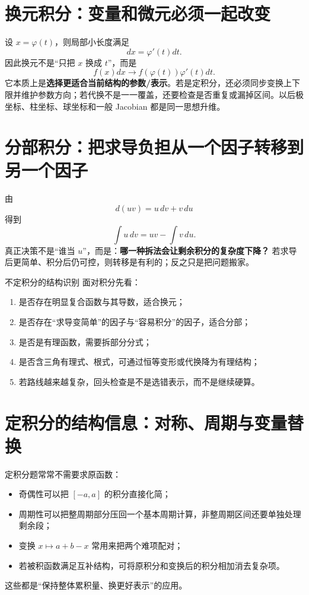 \documentclass[11pt,a4paper,openany]{ctexbook}
\newcommand{\key}[1]{\textbf{\color{deep}#1}}
\begin{document}
\section{换元积分：变量和微元必须一起改变}
设 $x=\varphi(t)$，则局部小长度满足
\[
dx=\varphi'(t)dt.
\]
因此换元不是“只把 $x$ 换成 $t$”，而是
\[
\boxed{f(x)dx\to f(\varphi(t))\varphi'(t)dt}.
\]
它本质上是\key{选择更适合当前结构的参数/表示}。若是定积分，还必须同步变换上下限并维护参数方向；若代换不是一一覆盖，还要检查是否重复或漏掉区间。以后极坐标、柱坐标、球坐标和一般 Jacobian 都是同一思想升维。

\section{分部积分：把求导负担从一个因子转移到另一个因子}
由
\[
d(uv)=u\,dv+v\,du
\]
得到
\[
\int u\,dv=uv-\int v\,du.
\]
真正决策不是“谁当 $u$”，而是：\key{哪一种拆法会让剩余积分的复杂度下降？} 若求导后更简单、积分后仍可控，则转移是有利的；反之只是把问题搬家。

\begin{methodbox}{不定积分的结构识别}
面对积分先看：
\begin{enumerate}
  \item 是否存在明显复合函数与其导数，适合换元；
  \item 是否存在“求导变简单”的因子与“容易积分”的因子，适合分部；
  \item 是否是有理函数，需要拆部分分式；
  \item 是否含三角有理式、根式，可通过恒等变形或代换降为有理结构；
  \item 若路线越来越复杂，回头检查是不是选错表示，而不是继续硬算。
\end{enumerate}
\end{methodbox}

\section{定积分的结构信息：对称、周期与变量替换}
定积分题常常不需要求原函数：
\begin{itemize}
  \item 奇偶性可以把 $[-a,a]$ 的积分直接化简；
  \item 周期性可以把整周期部分压回一个基本周期计算，非整周期区间还要单独处理剩余段；
  \item 变换 $x\mapsto a+b-x$ 常用来把两个难项配对；
  \item 若被积函数满足互补结构，可将原积分和变换后的积分相加消去复杂项。
\end{itemize}
这些都是“保持整体累积量、换更好表示”的应用。
\end{document}
